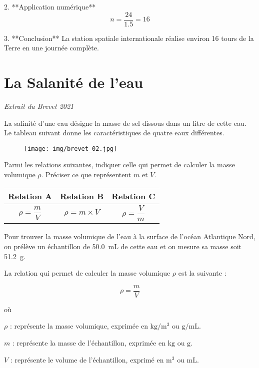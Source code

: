\documentclass[answers]{exam}
\begin{document}
\begin{questions}
\begin{solution}
2. **Application numérique**  
   \[
   n = \frac{24}{1.5} = 16
   \]

3. **Conclusion**  
   La station spatiale internationale réalise environ 16 tours de la Terre en une journée complète.
\end{solution}

\section*{La Salanité de l'eau}

\textit{Extrait du Brevet 2021}
\vspace{1em}

La salinité d’une eau désigne la masse de sel dissous dans un litre de cette eau.
Le tableau suivant donne les caractéristiques de quatre eaux différentes.

\begin{figure}[H]
  \centering
  \texttt{[image: img/brevet\_02.jpg]}
\end{figure}

  \question[3] Parmi les relations suivantes, indiquer celle qui permet de calculer la masse volumique $\rho$. Préciser ce que représentent $m$ et $V$.

  \begin{center}
    \renewcommand{\arraystretch}{2} %
    \setlength{\tabcolsep}{20pt}   %
    \begin{tabular}{|c|c|c|}
    \hline
    Relation A & Relation B & Relation C \\
    \hline
    $\rho = \dfrac{m}{V}$ & $\rho = m \times V$ & $\rho = \dfrac{V}{m}$ \\
    \hline
    \end{tabular}
    \end{center}
  
  Pour trouver la masse volumique de l’eau à la surface de l’océan Atlantique Nord, on prélève un échantillon de \SI{50.0}{\milli\liter} de cette eau et on mesure sa masse soit \SI{51.2}{\gram}.
  
  

\begin{solution}
La relation qui permet de calculer la masse volumique $\rho$ est la suivante :

\[
\rho = \frac{m}{V}
\]

où 

\begin{addmargin}[4em]{1em}
\begin{compactitem}
    \item [$\rho$]: représente la masse volumique, exprimée en \(\si{\kilo\gram\per\cubic\meter}\) ou \(\si{\gram\per\milli\liter}\).
    \item [$m$]: représente la masse de l'échantillon, exprimée en \(\si{\kilo\gram}\) ou \(\si{\gram}\).
    \item [$V$]: représente le volume de l'échantillon, exprimé en \(\si{\cubic\meter}\) ou \(\si{\milli\liter}\).
\end{compactitem}
\end{addmargin}


\end{solution}
\end{questions}
\end{document}
